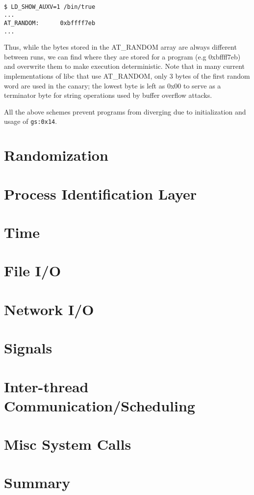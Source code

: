 \begin{mylisting}
\begin{verbatim}

$ LD_SHOW_AUXV=1 /bin/true
...
AT_RANDOM:      0xbffff7eb
...
\end{verbatim}
\end{mylisting}

Thus, while the bytes stored in the AT\_RANDOM array are always different
between runs, we can find where they are stored for a program (e.g 0xbffff7eb) and overwrite them
to make execution deterministic. Note that in many current implementations of libc that use AT\_RANDOM,
only 3 bytes of the first random word are used in the canary; the lowest byte is 
left as 0x00 to serve as a terminator byte for string operations used by 
buffer overflow attacks.

All the above schemes prevent programs from diverging due to initialization and usage 
of \texttt{gs:0x14}.

\section{Randomization}

\section{Process Identification Layer}

\section{Time}

\section{File I/O}

\section{Network I/O}

\section{Signals}

\section{Inter-thread Communication/Scheduling} 

\section{Misc System Calls}

\section {Summary}
